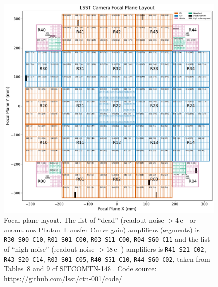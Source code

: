 \documentclass[OPS,lsstdraft,authoryear,toc]{lsstdoc}
\begin{document}
\begin{figure}
  \centering
  \includegraphics[width=\textwidth]{figures/LSSTCam_focal_plane_andres_2025MAR03.pdf}
  \caption{Focal plane layout. The list of ``dead'' (readout noise $> 4\,\mathrm{e}^{-}$ or anomalous Photon Transfer Curve gain) 
	amplifiers (segments) is {\tt{R30\_S00\_C10}}, {\tt{R01\_S01\_C00}}, {\tt{R03\_S11\_C00}}, {\tt{R04\_SG0\_C11}} 
and the list of ``high-noise'' (readout noise $> 18\,\mathrm{e}^{-}$) amplifiers is 
{{\tt{R41\_S21\_C02}}, {\tt{R43\_S20\_C14}}, {\tt{R03\_S01\_C05}}, {\tt{R40\_SG1\_C10}}, 
	{\tt{R44\_SG0\_C02}}, taken from Tables~8 and 9 of SITCOMTN-148 \citep{utsumi25}. Code source: \url{https://github.com/lsst/ctn-001/code/}}}
  \label{fig:focal_plane_1}
\end{figure}

\clearpage
\end{document}
